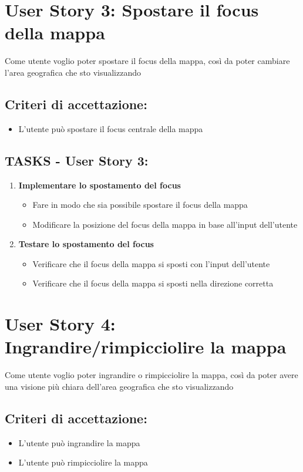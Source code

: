 \section*{User Story 3: Spostare il focus della mappa}  
Come utente voglio poter spostare il focus della mappa, così da poter cambiare l'area geografica che sto visualizzando
\subsection*{Criteri di accettazione:}  
    \begin{itemize}  
        \item L'utente può spostare il focus centrale della mappa  
    \end{itemize}  
    
    \subsection*{TASKS - User Story 3:}  
    \begin{enumerate}  
        \item \textbf{Implementare lo spostamento del focus}  
            \begin{itemize}  
                \item Fare in modo che sia possibile spostare il focus della mappa
                \item Modificare la posizione del focus della mappa in base all'input dell'utente
            \end{itemize}  
        \item \textbf{Testare lo spostamento del focus}  
            \begin{itemize}  
                \item Verificare che il focus della mappa si sposti con l'input dell'utente
                \item Verificare che il focus della mappa si sposti nella direzione corretta
            \end{itemize}  
    \end{enumerate}  
\section*{User Story 4: Ingrandire/rimpicciolire la mappa}  
Come utente voglio poter ingrandire o rimpicciolire la mappa, così da poter avere una visione più chiara dell'area geografica che sto visualizzando
\subsection*{Criteri di accettazione:}  
\begin{itemize}  
    \item L'utente può ingrandire la mappa
    \item L'utente può rimpicciolire la mappa
\end{itemize}  

